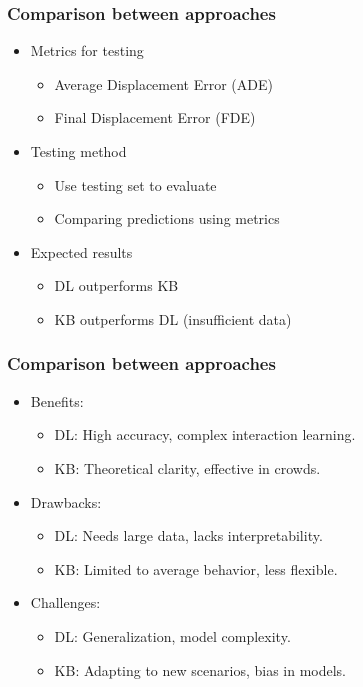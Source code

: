 \begin{frame}
    \frametitle{Comparison between approaches}
    \begin{itemize}
        \item Metrics for testing
        \begin{itemize}
            \item Average Displacement Error (ADE)
            \item Final Displacement Error (FDE)
        \end{itemize}
        \item Testing method
        \begin{itemize}
            \item Use testing set to evaluate
            \item Comparing predictions using metrics
        \end{itemize}
        \item Expected results
        \begin{itemize}
            \item DL outperforms KB
            \item KB outperforms DL (insufficient data)
        \end{itemize} 
    \end{itemize}
\end{frame}

\begin{frame}
    \frametitle{Comparison between approaches}
    \begin{itemize}
    \item Benefits:
        \begin{itemize}
            \item DL: High accuracy, complex interaction learning.
            \item KB: Theoretical clarity, effective in crowds.
        \end{itemize}
    \item Drawbacks:
        \begin{itemize}
            \item DL: Needs large data, lacks interpretability.
            \item KB: Limited to average behavior, less flexible.
        \end{itemize}
    \item Challenges:
        \begin{itemize}
            \item DL: Generalization, model complexity.
            \item KB: Adapting to new scenarios, bias in models.
        \end{itemize}
\end{itemize}
\end{frame}

